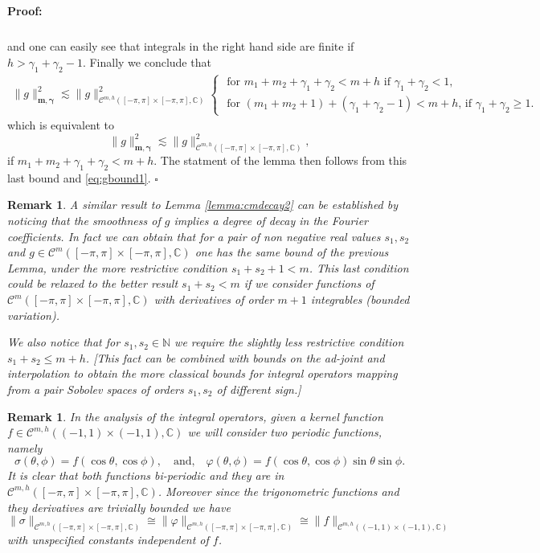 \documentclass{article}
\newtheorem{remark}[theorem]{Remark}
\newenvironment{proof}{\paragraph{Proof:}}{\hfill$\square$}
\newcommand{\todo}[1]{{\color{red}[#1]}}
\newcommand{\IC}{{\mathbb C}}
\newcommand{\IN}{{\mathbb N}}
\newcommand{\cmspace}[3]{\mathcal{C}^{#1} \left( #2, #3 \right)}
\newcommand{\cmspaceh}[4]{\mathcal{C}^{#1,#2} \left( #3, #4 \right)}
\newcommand{\iinterv}{(-1,1)\times(-1,1)}
\begin{document}
\begin{proof}
\begin{align*}
\end{align*}
and one can easily see that integrals in the right hand side are finite if $h > \gamma_1 + \gamma_2 -1$. 
Finally we conclude that 
\begin{align*}
\|g\|_{\mathbf{m},\mathbf{\gamma}}^2 \lesssim \|g\|^2_{\cmspaceh{m}{h}{[-\pi,\pi]\times[-\pi,\pi]}{\IC}}\begin{cases}
 \text{  for $m_1+m_2+\gamma_1 + \gamma_2 < m+h$ if $\gamma_1 + \gamma_2 < 1$},\\
 \text{ for $(m_1+m_2+1)+(\gamma_1+\gamma_2 -1)< m+h$, if $\gamma_1 + \gamma_2 \geq 1$}.
\end{cases}
\end{align*}
which is equivalent to 
$$
\|g\|_{\mathbf{m},\mathbf{\gamma}}^2 \lesssim \|g\|^2_{\cmspaceh{m}{h}{[-\pi,\pi]\times[-\pi,\pi]}{\IC}},
$$
if $m_1+m_2+\gamma_1+\gamma_2 < m+h$. 
The statment of the lemma then follows from this last bound and \eqref{eq:gbound1}.
\end{proof}
 
\begin{remark}
A similar result to Lemma \ref{lemma:cmdecay2} can be established by noticing that the smoothness of $g$ implies a degree of decay in the Fourier coefficients. In fact we can obtain that for a pair of non negative real values $s_1,s_2$ and $g \in \cmspace{m}{[-\pi,\pi]\times[-\pi,\pi]}{\IC}$ one has the same bound of the previous Lemma, under the more restrictive condition $s_1+s_2+1 < m$.
This last condition could be relaxed to the better result $s_1+s_2 < m$ if we consider functions of $\cmspace{m}{[-\pi,\pi]\times[-\pi,\pi]}{\IC}$ with derivatives of order $m+1$ integrables (bounded variation).

We also notice that for $s_1, s_2 \in \IN$ we require the slightly less restrictive condition $s_1+s_2 \leq m+h$. \todo{This fact can be combined with bounds on the ad-joint and interpolation to obtain the more classical bounds for integral operators mapping from a pair Sobolev spaces of orders $s_1,s_2$ of different sign.}
\end{remark}

\begin{remark}
\label{rem:sigmaphi}
In the analysis of the integral operators, given a kernel function $f \in \cmspaceh{m}{h}{\iinterv}{\IC}$ we will consider two periodic functions, namely 
$$
\sigma(\theta,\phi ) = f(\cos \theta, \cos \phi), \quad \text{and,} \quad \varphi(\theta,\phi) = f(\cos \theta, \cos \phi)\sin \theta \sin \phi.
$$
It is clear that both functions bi-periodic and they are in $\cmspaceh{m}{h}{[-\pi,\pi]\times[-\pi,\pi]}{\IC}$. Moreover since the trigonometric functions and they derivatives are trivially bounded we have
$$
\| \sigma \|_{\cmspaceh{m}{h}{[-\pi,\pi]\times[-\pi,\pi]}{\IC}} \cong \| \varphi \|_{\cmspaceh{m}{h}{[-\pi,\pi]\times[-\pi,\pi]}{\IC}} \cong \|f\|_{\cmspaceh{m}{h}{\iinterv}{\IC}}
$$ 
with unspecified constants independent of $f$. 
\end{remark}
\end{document}
